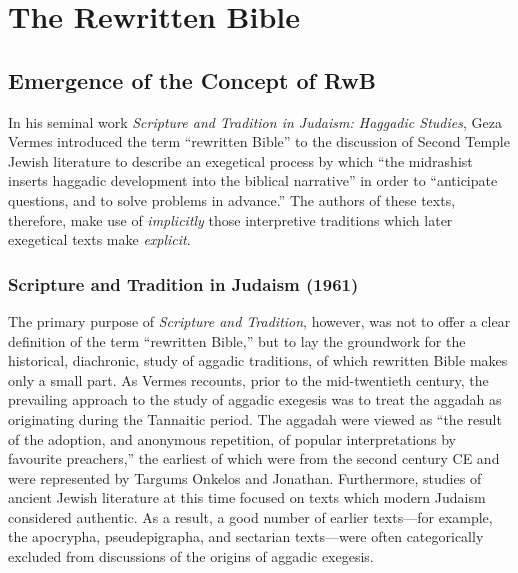 \chapter{The Rewritten Bible}\label{the-rewritten-bible}

\section{Emergence of the Concept of
RwB}\label{emergence-of-the-concept-of-rwb}

In his seminal work \emph{Scripture and Tradition in Judaism: Haggadic
Studies}, Geza Vermes introduced the term ``rewritten Bible'' to the
discussion of Second Temple Jewish literature to describe an exegetical
process by which ``the midrashist inserts haggadic development into the
biblical narrative'' in order to ``anticipate questions, and to solve
problems in advance.''\autocite[95]{vermes1961} The authors of these
texts, therefore, make use of \emph{implicitly} those interpretive
traditions which later exegetical texts make \emph{explicit}.

\subsection{Scripture and Tradition in Judaism
(1961)}\label{scripture-and-tradition-in-judaism-1961}

The primary purpose of \emph{Scripture and Tradition}, however, was not
to offer a clear definition of the term ``rewritten Bible,'' but to lay
the groundwork for the historical, diachronic, study of aggadic
traditions, of which rewritten Bible makes only a small part. As Vermes
recounts, prior to the mid-twentieth century, the prevailing approach to
the study of aggadic exegesis was to treat the aggadah as originating
during the Tannaitic period. The aggadah were viewed as ``the result of
the adoption, and anonymous repetition, of popular interpretations by
favourite preachers,'' \autocite[3]{vermes1961} the earliest of which
were from the second century CE and were represented by Targums Onkelos
and Jonathan. Furthermore, studies of ancient Jewish literature at this
time focused on texts which modern Judaism considered authentic. As a
result, a good number of earlier texts---for example, the apocrypha,
pseudepigrapha, and sectarian texts---were often categorically excluded
from discussions of the origins of aggadic
exegesis.\autocite[2]{vermes1961}

